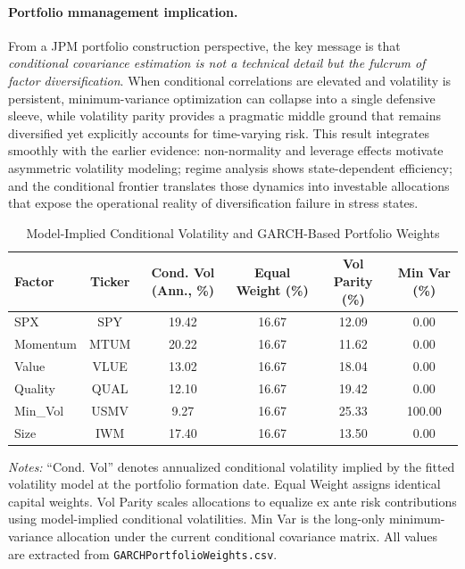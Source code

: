 \documentclass{article}
\begin{document}
\paragraph{Portfolio mmanagement implication.}
From a JPM portfolio construction perspective, the key message is that \emph{conditional covariance estimation is not a technical detail but the fulcrum of factor diversification}. When conditional correlations are elevated and volatility is persistent, minimum-variance optimization can collapse into a single defensive sleeve, while volatility parity provides a pragmatic middle ground that remains diversified yet explicitly accounts for time-varying risk. This result integrates smoothly with the earlier evidence: non-normality and leverage effects motivate asymmetric volatility modeling; regime analysis shows state-dependent efficiency; and the conditional frontier translates those dynamics into investable allocations that expose the operational reality of diversification failure in stress states.\newline

\begin{table}[!htbp]
\centering
\caption{Model-Implied Conditional Volatility and GARCH-Based Portfolio Weights}
\label{tab:garch_weights}
\small
\begin{tabular}{lccccc}
\toprule
Factor & Ticker & Cond. Vol (Ann., \%) & Equal Weight (\%) & Vol Parity (\%) & Min Var (\%) \\
\midrule
SPX      & SPY  & 19.42 & 16.67 & 12.09 & 0.00 \\
Momentum & MTUM & 20.22 & 16.67 & 11.62 & 0.00 \\
Value    & VLUE & 13.02 & 16.67 & 18.04 & 0.00 \\
Quality  & QUAL & 12.10 & 16.67 & 19.42 & 0.00 \\
Min\_Vol & USMV &  9.27 & 16.67 & 25.33 & 100.00 \\
Size     & IWM  & 17.40 & 16.67 & 13.50 & 0.00 \\
\bottomrule
\end{tabular}
\vspace{4pt}
\footnotesize
\emph{Notes:} ``Cond. Vol'' denotes annualized conditional volatility implied by the fitted volatility model at the portfolio formation date. Equal Weight assigns identical capital weights. Vol Parity scales allocations to equalize ex ante risk contributions using model-implied conditional volatilities. Min Var is the long-only minimum-variance allocation under the current conditional covariance matrix. All values are extracted from \texttt{GARCHPortfolioWeights.csv}.
\end{table}
\end{document}
